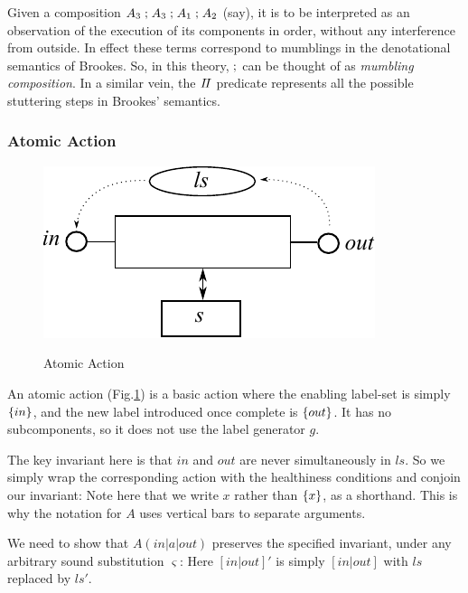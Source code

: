 Given a composition $A_3\mathrel{;} A_3\mathrel{;} A_1 \mathrel{;} A_2$ (say),
it is to be interpreted as an observation
of the execution of its components in order,
without any interference from outside.
In effect these terms correspond to mumblings in the denotational
semantics of Brookes\cite{DBLP:journals/iandc/Brookes96}.
So, in this theory, $\mathrel{;}$ can be thought of as \emph{mumbling composition}.
In a similar vein, the $I\!I$ predicate represents
all the possible stuttering steps in Brookes' semantics.


\newpage
\subsubsection{Atomic Action}

\begin{figure}
  \centering
  \includegraphics{images/atomic-action}\\
  \caption{Atomic Action}
  \label{fig:atomic-action}
\end{figure}

An atomic action (Fig.\ref{fig:atomic-action})
is a basic action where the enabling label-set is
simply $\{in\}$, and the new label introduced once complete
is $\{out\}$.
It has no subcomponents, so it does not use the label generator $g$.

The key invariant here is that $in$ and $out$ are never simultaneously in
$ls$. So we simply wrap the corresponding action with the healthiness
conditions and conjoin our invariant:
 Note here that we write $x$ rather than $\{x\}$, as a shorthand. This
is why the notation for $A$ uses vertical bars to separate arguments.

We need to show that $A(in|a|out)$ preserves the specified
invariant, under any arbitrary sound substitution $\varsigma$:
Here $[in|out]'$ is simply $[in|out]$ with $ls$ replaced by $ls'$.

